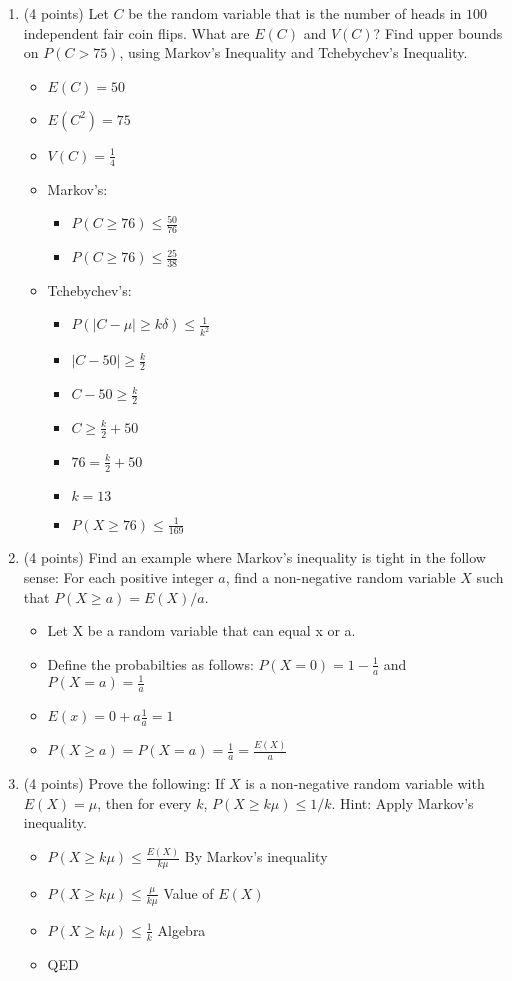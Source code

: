 \documentclass[11pt]{article}
\begin{document}
\begin{enumerate}
\item (4 points) Let $C$ be the random variable that is the number of heads in
$100$ independent fair coin flips.  What are $E(C)$ and $V(C)$?  Find upper
bounds on $P(C > 75)$, using Markov's Inequality and Tchebychev's Inequality.
\begin{itemize}
	\item $E(C) = 50$
	\item $E(C^{2}) = 75$
	\item $V(C) = \frac{1}{4}$
	\item Markov's:
	\begin{itemize}
		\item $P(C \geq 76) \leq \frac{50}{76}$
		\item $P(C \geq 76) \leq \frac{25}{38}$
	\end{itemize}
	\item Tchebychev's:
	\begin{itemize}
		\item $P(|C-\mu| \geq k\delta) \leq \frac{1}{k^{2}}$
		\item $|C-50| \geq \frac{k}{2}$
		\item $C-50 \geq \frac{k}{2}$
		\item $C \geq \frac{k}{2} + 50$
		\item $76 = \frac{k}{2} + 50$
		\item $k=13$
		\item $P(X \geq 76) \leq \frac{1}{169}$
	\end{itemize}
\end{itemize}

\item (4 points) Find an example where Markov's inequality is tight in the
follow sense: For each  positive integer $a$, find a non-negative random
variable $X$ such that $P(X\geq a) = E(X)/a$.
\begin{itemize}
	\item Let X be a random variable that can equal x or a.
	\item Define the probabilties as follows: $P(X=0) = 1-\frac{1}{a}$ and 
	$P(X=a) = \frac{1}{a}$
	\item $E(x) = 0+a\frac{1}{a} = 1$
	\item $P(X \geq a) = P(X = a) = \frac{1}{a} = \frac{E(X)}{a}$
\end{itemize}

\item (4 points) Prove the following: If $X$ is a non-negative random variable
with $E(X) = \mu$, then for every $k$, $P(X \geq k\mu) \leq 1/k$.
\textsf{Hint:  Apply Markov's inequality.}
\begin{itemize}
		\item $P(X \geq k\mu) \leq \frac{E(X)}{k\mu}$ By Markov's inequality
		\item $P(X \geq k\mu) \leq \frac{\mu}{k\mu}$ Value of $E(X)$
		\item $P(X \geq k\mu) \leq \frac{1}{k}$ Algebra
		\item QED
\end{itemize}


\end{enumerate}
\end{document}
